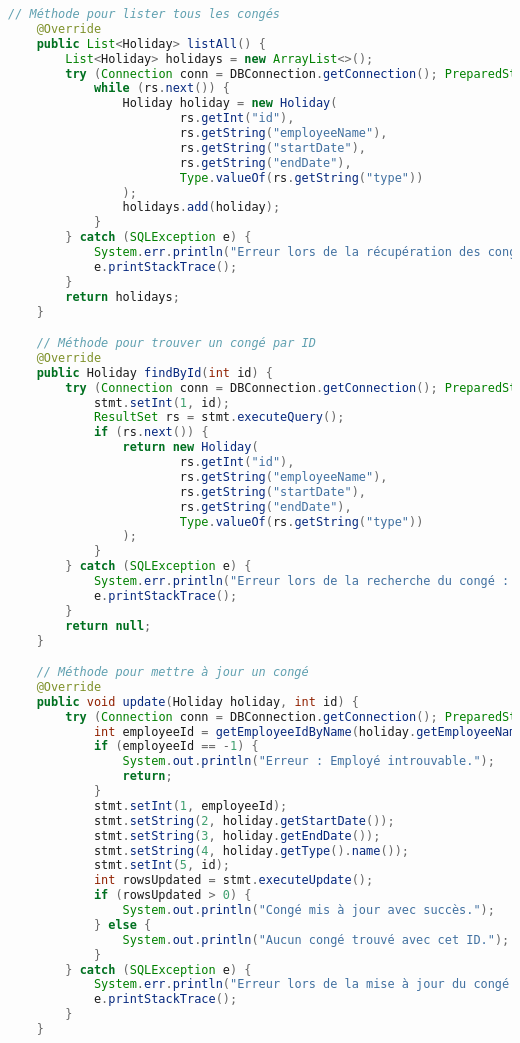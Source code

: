 \documentclass[a4paper,12pt]{article}
\begin{document}
\begin{lstlisting}[language=Java, caption={DAO HolidayDAOImpl}, label={lst:holidayDAOImpl}]
    // Méthode pour lister tous les congés
    @Override
    public List<Holiday> listAll() {
        List<Holiday> holidays = new ArrayList<>();
        try (Connection conn = DBConnection.getConnection(); PreparedStatement stmt = conn.prepareStatement(SELECT_ALL_HOLIDAY_SQL); ResultSet rs = stmt.executeQuery()) {
            while (rs.next()) {
                Holiday holiday = new Holiday(
                        rs.getInt("id"),
                        rs.getString("employeeName"),
                        rs.getString("startDate"),
                        rs.getString("endDate"),
                        Type.valueOf(rs.getString("type"))
                );
                holidays.add(holiday);
            }
        } catch (SQLException e) {
            System.err.println("Erreur lors de la récupération des congés : " + e.getMessage());
            e.printStackTrace();
        }
        return holidays;
    }

    // Méthode pour trouver un congé par ID
    @Override
    public Holiday findById(int id) {
        try (Connection conn = DBConnection.getConnection(); PreparedStatement stmt = conn.prepareStatement(SELECT_HOLIDAY_BY_ID_SQL)) {
            stmt.setInt(1, id);
            ResultSet rs = stmt.executeQuery();
            if (rs.next()) {
                return new Holiday(
                        rs.getInt("id"),
                        rs.getString("employeeName"),
                        rs.getString("startDate"),
                        rs.getString("endDate"),
                        Type.valueOf(rs.getString("type"))
                );
            }
        } catch (SQLException e) {
            System.err.println("Erreur lors de la recherche du congé : " + e.getMessage());
            e.printStackTrace();
        }
        return null;
    }

    // Méthode pour mettre à jour un congé
    @Override
    public void update(Holiday holiday, int id) {
        try (Connection conn = DBConnection.getConnection(); PreparedStatement stmt = conn.prepareStatement("UPDATE holiday SET employeeId = ?, startDate = ?, endDate = ?, type = ? WHERE id = ?")) {
            int employeeId = getEmployeeIdByName(holiday.getEmployeeName());
            if (employeeId == -1) {
                System.out.println("Erreur : Employé introuvable.");
                return;
            }
            stmt.setInt(1, employeeId);
            stmt.setString(2, holiday.getStartDate());
            stmt.setString(3, holiday.getEndDate());
            stmt.setString(4, holiday.getType().name());
            stmt.setInt(5, id);
            int rowsUpdated = stmt.executeUpdate();
            if (rowsUpdated > 0) {
                System.out.println("Congé mis à jour avec succès.");
            } else {
                System.out.println("Aucun congé trouvé avec cet ID.");
            }
        } catch (SQLException e) {
            System.err.println("Erreur lors de la mise à jour du congé : " + e.getMessage());
            e.printStackTrace();
        }
    }


\end{lstlisting}
\end{document}
